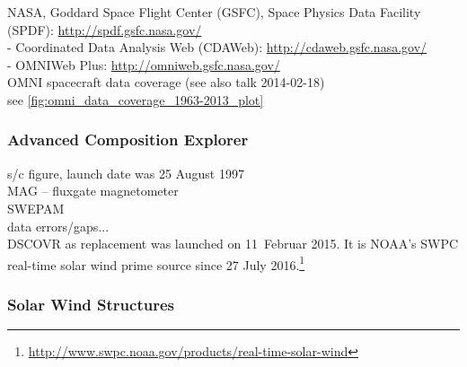 NASA, Goddard Space Flight Center (GSFC), Space Physics Data Facility (SPDF): \url{http://spdf.gsfc.nasa.gov/}\\	%
- Coordinated Data Analysis Web (CDAWeb): \url{http://cdaweb.gsfc.nasa.gov/}\\	%
- OMNIWeb Plus: \url{http://omniweb.gsfc.nasa.gov/}\\	%


OMNI spacecraft data coverage (see also talk 2014-02-18)\\
see \autoref{fig:omni_data_coverage_1963-2013_plot}
\begin{figure}[htb]
\end{figure}


\subsubsection{Advanced Composition Explorer}

s/c figure, launch date was 25 August 1997\\

MAG -- fluxgate magnetometer\\
SWEPAM\\	%

data errors/gaps...\\

DSCOVR as replacement was launched on 11~Februar 2015. It is NOAA's SWPC real-time solar wind prime source since 27 July 2016.\footnote{\url{http://www.swpc.noaa.gov/products/real-time-solar-wind}}\\


\subsubsection{Solar Wind Structures}


